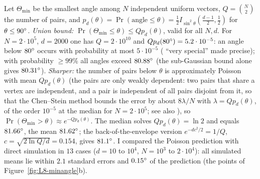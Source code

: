 \begin{beyond}\label{box:L8-minangle}
Let $\Theta_{\min}$ be the smallest angle among $N$ independent uniform vectors, $Q=\binom N2$ the number of pairs, and $p_d(\theta)=\Pr(\text{angle}\le\theta)=\tfrac12I_{\sin^2\theta}(\frac{d-1}2,\frac12)$ for $\theta\le90^{\circ}$. \emph{Union bound:} $\Pr(\Theta_{\min}\le\theta)\le Qp_d(\theta)$, valid for all $N,d$. For $N=2\cdot10^5$, $d=2000$ one has $Q=2\cdot10^{10}$ and $Qp_d(80^{\circ})=5.2\cdot10^{-5}$: an angle below $80^{\circ}$ occurs with probability at most $5\cdot10^{-5}$ ( ``very special'' made precise); with probability $\ge99\%$ all angles exceed $80.88^{\circ}$ (the sub-Gaussian bound alone gives $80.31^{\circ}$). \emph{Sharper:} the number of pairs below $\theta$ is approximately Poisson with mean $Qp_d(\theta)$ (the pairs are only weakly dependent: two pairs that share a vertex are independent, and a pair is independent of all pairs disjoint from it, so that the Chen--Stein method \citep{arratia1989} bounds the error by about $8\lambda/N$ with $\lambda=Qp_d(\theta)$, of the order $10^{-5}$ at the median for $N=2\cdot10^5$; see also \citealp{cai2013}), so $\Pr(\Theta_{\min}>\theta)\approx e^{-Qp_d(\theta)}$. The median solves $Qp_d(\theta)=\ln2$ and equals $81.66^{\circ}$, the mean $81.62^{\circ}$; the back-of-the-envelope version $e^{-dc^2/2}=1/Q$, $c=\sqrt{2\ln Q/d}=0.154$, gives $81.1^{\circ}$. I compared the Poisson prediction with direct simulation in $13$ cases ($d=10$ to $10^4$, $N=10^3$ to $2\cdot10^4$): all simulated means lie within $2.1$ standard errors and $0.15^{\circ}$ of the prediction (the points of Figure~\ref{fig:L8-minangle}b).


\end{beyond}
